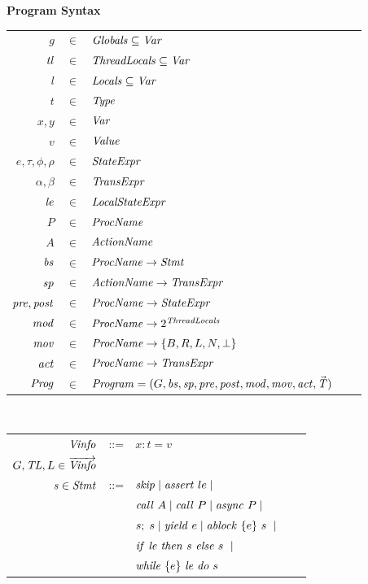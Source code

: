 \begin{figure}
\setlength{\tabcolsep}{3pt}
{\bf Program Syntax} \\
\begin{tabular}{rclcl}
$g$ & $\in$ & $\mathit{Globals} \subseteq \mathit{Var}$ \\
$\mathit{tl}$ & $\in$ & $\mathit{ThreadLocals} \subseteq \mathit{Var}$ \\
$l$ & $\in$ & $\mathit{Locals} \subseteq \mathit{Var}$ \\
$t$ & $\in$ & $\mathit{Type}$ \\
$x,y$ & $\in$ & $\mathit{Var}$ \\
$v$ &  $\in$ & $\mathit{Value}$ \\
$e, \tau, \phi, \rho$ & $\in$ & $\mathit{StateExpr}$ \\
$\alpha, \beta$ & $\in$ & $\mathit{TransExpr}$ \\
$\mathit{le}$ & $\in$ & $\mathit{LocalStateExpr}$ \\
$P$ & $\in$ & $\mathit{ProcName}$ \\
$A$ & $\in$ & $\mathit{ActionName}$ \\
$\mathit{bs}$ & $\in$ & $\mathit{ProcName} \rightarrow \mathit{Stmt}$ \\
$\mathit{sp}$ & $\in$ & $\mathit{ActionName} \rightarrow \mathit{TransExpr}$ \\
$\mathit{pre},\mathit{post}$ & $\in$ & $\mathit{ProcName} \rightarrow \mathit{StateExpr}$ \\
$\mathit{mod}$ & $\in$ & $\mathit{ProcName} \rightarrow 2^{\mathit{ThreadLocals}}$ \\
$\mathit{mov}$ & $\in$ & $\mathit{ProcName} \rightarrow \{B,R,L,N,\perp\}$ \\
$\mathit{act}$ & $\in$ & $\mathit{ProcName} \rightarrow \mathit{TransExpr}$ \\
$\mathit{Prog}$ & $\in$ & $\mathit{Program} = (G, \mathit{bs}, \mathit{sp}, \mathit{pre}, \mathit{post}, \mathit{mod}, \mathit{mov}, \mathit{act}, \vec{\mathit{T}})$ \\
\end{tabular}
~\\
\begin{tabular}{rclcl}
$\mathit{Vinfo}$ &::= & $x:t=v$ \\
$G,\mathit{TL},L \in \overrightarrow{\mathit{Vinfo}}$ \\
$\mathit{s} \in \mathit{Stmt}$ &::= & $\mathit{skip} \mid \mathit{assert}\ le \mid $ \\
                  & & $\mathit{call}\ A \mid \mathit{call}\ P \mid \mathit{async}\ P \mid $\\
                  & & $s;\;s \mid \mathit{yield}\ e \mid \mathit{ablock}\ {\{e\}}\ {s}\  \mid$\\
                 & & ${\mathit{if}\ {\mathit{le}}\ }{\mathit{then}\ {s}\ }{\mathit{else}\ {s}\ } \mid$ \\
                  & & $\mathit{while}\ \{{e}\}\ {{\mathit{le}}\ } \mathit{do}\ {{s}\ }$ \\ 

\end{tabular}
\end{figure}
